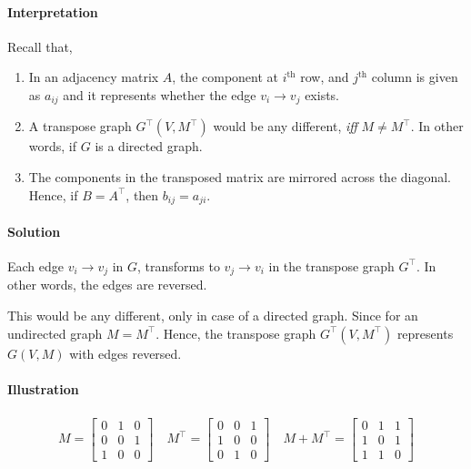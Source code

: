 \documentclass[11pt]{article}
\begin{document}
\paragraph*{Interpretation}
\label{sec:org44ce834}
Recall that,
\begin{enumerate}
\item In an adjacency matrix \(A\), the component at
\(i^{\text{th}}\) row, and \(j^{\text{th}}\) column is
given as \(a_{ij}\) and it represents whether the edge
\(v_{i}\to v_{j}\) exists.
\item A transpose graph \(G^{\top}(V,M^{\top})\) would be
any different, \emph{iff} \(M\ne M^{\top}\).  In other
words, if \(G\) is a directed graph.
\item The components in the transposed matrix are mirrored
across the diagonal.  Hence, if \(B = A^{\top}\), then
\(b_{ij} = a_{ji}\).
\end{enumerate}

\paragraph*{Solution}
\label{sec:org3ec361b}

Each edge \(v_{i}\to v_{j}\) in \(G\), transforms to
\(v_{j}\to v_{i}\) in the transpose graph \(G^{\top}\).
In other words, the edges are reversed.

This would be any different, only in case of a directed
graph.  Since for an undirected graph \(M=M^{\top}\).
Hence, the transpose graph \(G^{\top}(V,M^{\top})\)
represents \(G(V,M)\) with edges reversed.

\paragraph*{Illustration}
\label{sec:orgd5bf782}

\begin{align*}
  M = \begin{bmatrix}
    0&1&0\\0&0&1\\1&0&0
  \end{bmatrix}\quad M^{\top} = \begin{bmatrix}
    0&0&1\\1&0&0\\0&1&0
  \end{bmatrix}\quad M+M^{\top} = \begin{bmatrix}
    0&1&1\\1&0&1\\1&1&0
  \end{bmatrix}
\end{align*}
\end{document}
